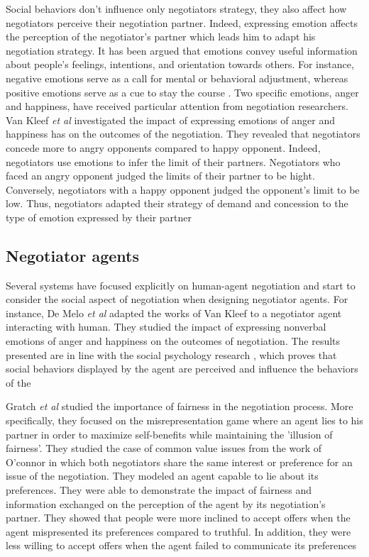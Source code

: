 \documentclass[runningheads,a4paper]{llncs}
\begin{document}
	Social behaviors don't influence only negotiators strategy, they also affect how negotiators perceive their negotiation partner. Indeed, expressing emotion affects the perception of the negotiator's partner which leads him to adapt his negotiation strategy. It has been argued that emotions convey useful information about people’s feelings, intentions, and orientation towards others. For instance, negative emotions serve as a call for	mental or behavioral adjustment, whereas positive emotions serve as a cue to stay the course \cite{cacioppo1999emotion}. 
	Two specific emotions, anger and happiness, have received particular attention from negotiation researchers. Van Kleef \textit{et al} investigated the impact of expressing emotions of anger and happiness has on the outcomes of the negotiation\cite{van2006power}. They revealed that negotiators concede more to angry opponents compared to happy opponent. Indeed, negotiators use emotions to infer the limit of their partners. 
	Negotiators who faced an angry opponent judged the limits of their partner to be hight. Conversely, negotiators with a happy opponent judged the opponent’s limit to be low. Thus, negotiators adapted their strategy of demand and concession to the type of emotion expressed by their partner
	
	\subsection{Negotiator agents}
	
	Several systems have focused explicitly on human-agent negotiation and start to consider the social aspect of negotiation when designing negotiator agents. For instance, De Melo \textit{et al} \cite{de2011effect} adapted the works of Van Kleef to a negotiator agent interacting with human. They studied the impact of expressing nonverbal emotions of anger and happiness on the outcomes of negotiation. The results presented are in line with the social psychology research \cite{van2006power}, which proves that social behaviors displayed by the agent are perceived and influence the behaviors of the
	
	Gratch \textit{et al} studied the importance of fairness in the negotiation process. More specifically, they focused on the misrepresentation game where an agent lies to his partner in order to maximize self-benefits while maintaining the 'illusion of fairness'. 
	They studied the case of common value issues from the work of O'connor \cite{o1997nasty} in which both negotiators share the same interest or preference for an issue of the negotiation. They modeled an agent capable to lie about its preferences. They were able to demonstrate the impact of fairness and information exchanged on the perception of the agent by its negotiation's partner. 
	They showed that people were more inclined to accept offers when the agent mispresented its preferences compared to truthful. In addition, they were less willing to accept offers when the agent failed to communicate its preferences
	
\end{document}
